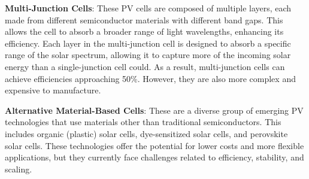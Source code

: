 \textbf{Multi-Junction Cells}: These PV cells are composed of multiple layers, 
each made from different semiconductor materials with different band gaps. This 
allows the cell to absorb a broader range of light wavelengths, enhancing its 
efficiency. Each layer in the multi-junction cell is designed to absorb a 
specific range of the solar spectrum, allowing it to capture more of the 
incoming solar energy than a single-junction cell could. As a result, 
multi-junction cells can achieve efficiencies approaching 50\%. However, they 
are also more complex and expensive to manufacture.

\textbf{Alternative Material-Based Cells}: These are a diverse group of emerging 
PV technologies that use materials other than traditional semiconductors. This 
includes organic (plastic) solar cells, dye-sensitized solar cells, and 
perovskite solar cells. These technologies offer the potential for lower costs 
and more flexible applications, but they currently face challenges related to 
efficiency, stability, and scaling.
